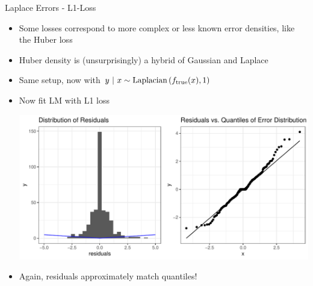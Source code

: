 \documentclass[11pt,compress,t,notes=noshow, xcolor=table]{beamer}
\begin{document}
\begin{vbframe}{Laplace Errors - L1-Loss}
\begin{itemize}
\item Some losses correspond to more complex or less known error densities, like the Huber loss 

\item Huber density is (unsurprisingly) a hybrid of Gaussian and Laplace

\end{itemize}

\framebreak 

\begin{itemize}
	\item Same setup, now with $y ~|~x \sim \text{Laplacian}\left(f_{\text{true}}(x), 1\right)$ 
\item Now fit LM with L1 loss

\vfill

\includegraphics{figure/residuals_plot_L1.pdf}


\item Again, residuals approximately match quantiles!


\end{itemize}


\end{vbframe}
\end{document}

